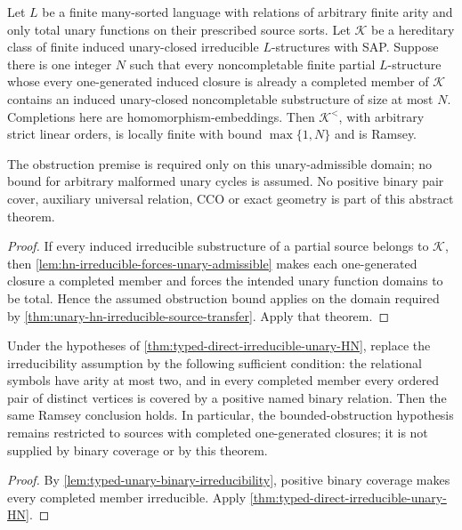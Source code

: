 \begin{theorem}
\label{thm:typed-direct-irreducible-unary-HN}
Let $L$ be a finite many-sorted language with relations of arbitrary finite
arity and only total unary functions on their prescribed source sorts.
Let $\mathcal K$ be a hereditary class of finite induced unary-closed
irreducible $L$-structures with SAP. Suppose there is one integer $N$
such that every noncompletable finite partial $L$-structure whose every
one-generated induced closure is already a completed member of
$\mathcal K$ contains an induced unary-closed noncompletable substructure
of size at most $N$. Completions here are homomorphism-embeddings.
Then $\mathcal K^<$, with arbitrary strict linear orders, is locally
finite with bound $\max\{1,N\}$ and is Ramsey.

The obstruction premise is required only on this unary-admissible domain;
no bound for arbitrary malformed unary cycles is assumed. No positive
binary pair cover, auxiliary universal relation, CCO or exact geometry
is part of this abstract theorem.
\end{theorem}
\begin{proof}
If every induced irreducible substructure of a partial source belongs to
$\mathcal K$, then \cref{lem:hn-irreducible-forces-unary-admissible}
makes each one-generated closure a completed member and forces the
intended unary function domains to be total. Hence the assumed
obstruction bound applies on the domain required by
\cref{thm:unary-hn-irreducible-source-transfer}. Apply that theorem.
\end{proof}

\begin{theorem}
\label{thm:typed-abstract-unary-HN-ramsey}
Under the hypotheses of \cref{thm:typed-direct-irreducible-unary-HN},
replace the irreducibility assumption by the following sufficient
condition: the relational symbols have arity at most two, and in every
completed member every ordered pair of distinct vertices is covered by a
positive named binary relation. Then the same Ramsey conclusion holds.
In particular, the bounded-obstruction hypothesis remains restricted to
sources with completed one-generated closures; it is not supplied by
binary coverage or by this theorem.
\end{theorem}
\begin{proof}
By \cref{lem:typed-unary-binary-irreducibility}, positive binary coverage
makes every completed member irreducible. Apply
\cref{thm:typed-direct-irreducible-unary-HN}.
\end{proof}
